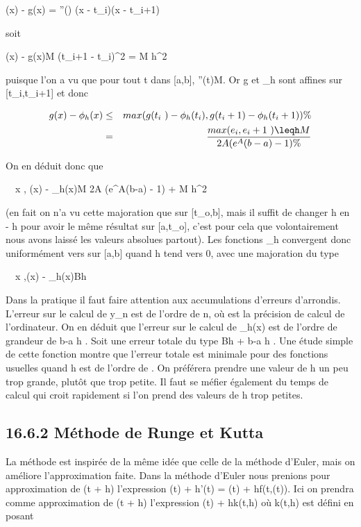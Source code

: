 \documentclass[]{article}
\begin{document}
\phi(x) - g(x) = \phi''(\xi) (x - t_i)(x - t_i+1)

soit

\phi(x) - g(x)\leq M (t_i+1 -
t_i)^2  = M h^2

puisque l'on a vu que pour tout t dans [a,b],
\phi''(t)\leq M. Or g et \phi_h sont affines sur
[t_i,t_i+1] et donc

\begin{align*} g(x) -
\phi_h(x)& \leq&
max(g(t_i~) -
\phi_h(t_i),g(t_i+1) -
\phi_h(t_i+1))\%&
\\ & =&
max(e_i,e_i+1~)
\leqh M \over 2A
(e^A(b-a) - 1) \%& \\
\end{align*}

On en déduit donc que

\forall~~x \in [a,b], \phi(x) -
\phi_h(x)\leqh M \over
2A (e^A(b-a) - 1) + M h^2 

(en fait on n'a vu cette majoration que sur [t_o,b], mais
il suffit de changer h en - h pour avoir le même résultat sur
[a,t_o], c'est pour cela que volontairement nous avons
laissé les valeurs absolues partout). Les fonctions \phi_h
convergent donc uniformément vers \phi sur [a,b] quand h tend vers 0,
avec une majoration du type

\forall~~x \in [a,b],\phi(x) -
\phi_h(x)\leq Bh

Dans la pratique il faut faire attention aux accumulations d'erreurs
d'arrondis. L'erreur sur le calcul de y_n est de l'ordre de n\epsilon,
où \epsilon est la précision de calcul de l'ordinateur. On en déduit que
l'erreur sur le calcul de \phi_h(x) est de l'ordre de grandeur de
 b-a \over h \epsilon. Soit une erreur totale du type Bh +
b-a \over h \epsilon. Une étude simple de cette fonction
montre que l'erreur totale est minimale pour des fonctions usuelles
quand h est de l'ordre de \sqrt\epsilon. On préférera
prendre une valeur de h un peu trop grande, plutôt que trop petite. Il
faut se méfier également du temps de calcul qui croit rapidement si l'on
prend des valeurs de h trop petites.

\subsection{16.6.2 Méthode de Runge et Kutta}

La méthode est inspirée de la même idée que celle de la méthode d'Euler,
mais on améliore l'approximation faite. Dans la méthode d'Euler nous
prenions pour approximation de \phi(t + h) l'expression \phi(t) + h\phi'(t) =
\phi(t) + hf(t,\phi(t)). Ici on prendra comme approximation de \phi(t + h)
l'expression \phi(t) + hk(t,h) où k(t,h) est défini en posant
\end{document}
